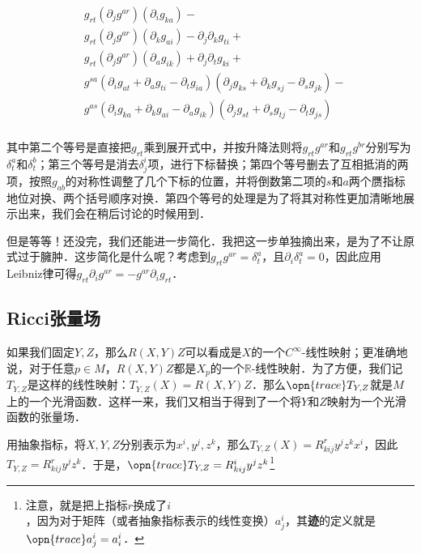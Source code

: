 \begin{equation}
\begin{aligned}
&g_{rt}(\partial_jg^{ar})(\partial_ig_{ka})-\\
&g_{rt}(\partial_jg^{ar})(\partial_kg_{ai})-\partial_j\partial_kg_{ti}+\\
&g_{rt}(\partial_jg^{ar})(\partial_ag_{ik})+\partial_j\partial_tg_{ki}+\\%
&g^{sa}(\partial_ig_{at}+\partial_ag_{ti}-\partial_tg_{ia})(\partial_jg_{ks}+\partial_kg_{sj}-\partial_sg_{jk})-\\
&g^{as}(\partial_ig_{ka}+\partial_kg_{ai}-\partial_ag_{ik})(\partial_jg_{st}+\partial_sg_{tj}-\partial_tg_{js})\\
\end{aligned}
\end{equation}

其中第二个等号是直接把$g_{rt}$乘到展开式中，并按升降法则将$g_{rt}g^{ar}$和$g_{rt}g^{br}$分别写为$\delta^a_t$和$\delta^b_t$；第三个等号是消去$\delta^i_j$项，进行下标替换；第四个等号删去了互相抵消的两项，按照$g_{ab}$的对称性调整了几个下标的位置，并将倒数第二项的$s$和$a$两个赝指标地位对换、两个括号顺序对换．第四个等号的处理是为了将其对称性更加清晰地展示出来，我们会在稍后讨论的时候用到．

但是等等！还没完，我们还能进一步简化．我把这一步单独摘出来，是为了不让原式过于臃肿．这步简化是什么呢？考虑到$g_{rt}g^{ar}=\delta^a_t$，且$\partial_i\delta^a_t=0$，因此应用Leibniz律可得$g_{rt}\partial_ig^{ar}=-g^{ar}\partial_ig_{rt}$．













\subsection{Ricci张量场}

如果我们固定$Y, Z$，那么$R(X, Y)Z$可以看成是$X$的一个$C^{\infty}$-线性映射；更准确地说，对于任意$p\in M$，$R(X, Y)Z$都是$X_p$的一个$\mathbb{R}$-线性映射．为了方便，我们记$T_{Y, Z}$是这样的线性映射：$T_{Y, Z}(X)=R(X, Y)Z$．那么$\opn{trace}T_{Y, Z}$就是$M$上的一个光滑函数．这样一来，我们又相当于得到了一个将$Y$和$Z$映射为一个光滑函数的张量场．

用抽象指标，将$X, Y, Z$分别表示为$x^i, y^j, z^k$，那么$T_{Y, Z}(X)=R^r_{kij}y^jz^kx^i$，因此$T_{Y, Z}=R^r_{kij}y^jz^k$．于是，$\opn{trace}T_{Y, Z}=R^i_{kij}y^jz^k$\footnote{注意，就是把上指标$r$换成了$i$，因为对于矩阵（或者抽象指标表示的线性变换）$a^i_j$，其\textbf{迹}的定义就是$\opn{trace}a^i_j=a^i_i$．}

